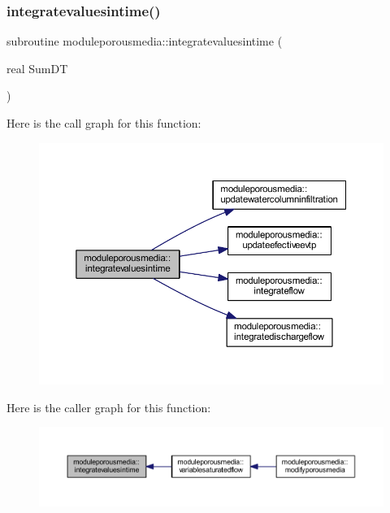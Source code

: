 \subsubsection{\texorpdfstring{integratevaluesintime()}{integratevaluesintime()}}
{\footnotesize\ttfamily subroutine moduleporousmedia\+::integratevaluesintime (\begin{DoxyParamCaption}\item[{real}]{Sum\+DT }\end{DoxyParamCaption})\hspace{0.3cm}{\ttfamily [private]}}

Here is the call graph for this function\+:\nopagebreak
\begin{figure}[H]
\begin{center}
\leavevmode
\includegraphics[width=350pt]{namespacemoduleporousmedia_a65ff629d0c1ef9ecd5231bc72cc38c06_cgraph}
\end{center}
\end{figure}
Here is the caller graph for this function\+:\nopagebreak
\begin{figure}[H]
\begin{center}
\leavevmode
\includegraphics[width=350pt]{namespacemoduleporousmedia_a65ff629d0c1ef9ecd5231bc72cc38c06_icgraph}
\end{center}
\end{figure}
\mbox{\label{namespacemoduleporousmedia_a349fd0e731f948138864367a533ec7aa}} 

